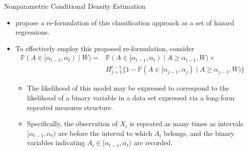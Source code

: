 \documentclass{beamer}
\newcommand{\pr}{\mathbb{P}}
\begin{document}
\begin{frame}[c]{Nonparametric Conditional Density Estimation}

\begin{center}
\begin{itemize}
  \itemsep8pt
  \item \cite{diaz2011super} propose a re-formulation of this classification
    approach as a set of hazard regressions.
  \item To effectively employ this proposed re-formulation, consider
    \begin{align*}
      \pr (A \in [\alpha_{t-1}, \alpha_t) \mid W) =& \pr (A \in [\alpha_{t-1},
      \alpha_t) \mid A \geq \alpha_{t-1}, W) \times  \\ & \Pi_{j = 1}^{t -1}
      \{1 - \pr (A \in [\alpha_{j-1}, \alpha_j) \mid A \geq \alpha_{j-1}, W) \}
    \end{align*}
    \vspace{0.25em}
    \begin{itemize}
      \itemsep4pt
      \item The likelihood of this model may be expressed to correspond to the
        likelihood of a binary variable in a data set expressed via a long-form
        repeated measures structure.
      \item Specifically, the observation of $X_i$ is repeated as many times as
        intervals $[\alpha_{t-1}, \alpha_t)$ are before the interval to which
        $A_i$ belongs, and the binary variables indicating $A_i \in
        [\alpha_{t-1}, \alpha_t)$ are recorded.
    \end{itemize}
\end{itemize}
\end{center}

\note{
}

\end{frame}

\end{document}
